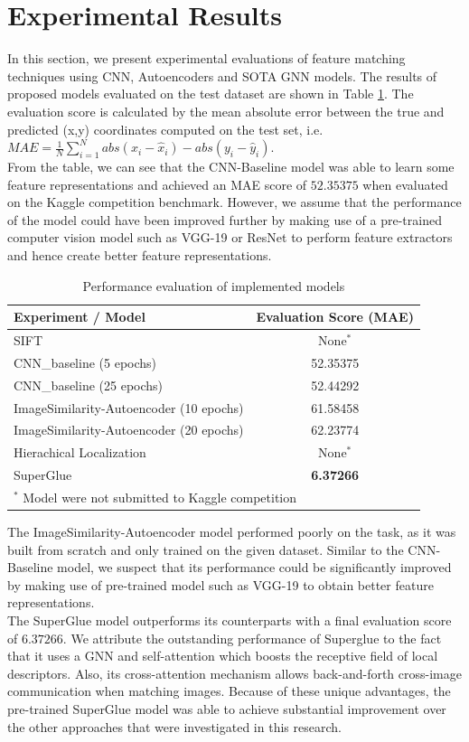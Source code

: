 \documentclass[conference]{IEEEtran}
\begin{document}
\section{Experimental Results}
\label{experimental_results}
In this section, we present experimental evaluations of feature matching techniques using CNN, Autoencoders and SOTA GNN models. The results of proposed models evaluated on the test dataset are shown in Table \ref{tab:results}. The evaluation score is calculated by the mean absolute error between the true and predicted (x,y) coordinates computed on the test set, i.e. $MAE = \frac{1}{N} \sum_{i=1}^{N} abs(x_i - \hat{x}_i) - abs(y_i - \hat{y}_i)$. \\
From the table, we can see that the CNN-Baseline model was able to learn some feature representations and achieved an MAE score of $52.35375$ when evaluated on the Kaggle competition benchmark. However, we assume that the performance of the model could have been improved further by making use of a pre-trained computer vision model such as VGG-19 or ResNet to perform feature extractors and hence create better feature representations.\\
\begin{table}[htbp]
\caption{Performance evaluation of implemented models}
\begin{center}
\begin{tabular}{|l|c|}
\hline
\textbf{Experiment / Model} & \textbf{Evaluation Score (MAE)} \\
\hline
SIFT & None$^{\mathrm{*}}$ \\
CNN\_baseline (5 epochs)  & 52.35375 \\
CNN\_baseline (25 epochs) & 52.44292 \\
ImageSimilarity-Autoencoder (10 epochs) & 61.58458 \\
ImageSimilarity-Autoencoder (20 epochs)  & 62.23774 \\
Hierachical Localization & None$^{\mathrm{*}}$ \\
SuperGlue & \textbf{6.37266} \\
\hline
\multicolumn{2}{l}{$^{\mathrm{*}}$ Model were not submitted to Kaggle competition}
\end{tabular}
\label{tab:results}
\end{center}
\end{table}
The ImageSimilarity-Autoencoder model performed poorly on the task, as it was built from scratch and only trained on the given dataset. Similar to the CNN-Baseline model, we suspect that its performance could be significantly improved by making use of pre-trained model such as VGG-19 to obtain better feature representations. \\ 
The SuperGlue model outperforms its counterparts with a final evaluation score of $6.37266$. We attribute the outstanding performance of Superglue to the fact that it uses a GNN and self-attention which boosts the receptive field of local descriptors. Also, its cross-attention mechanism allows back-and-forth cross-image communication when matching images. Because of these unique advantages, the pre-trained SuperGlue model was able to achieve substantial improvement over the other approaches that were investigated in this research.
\end{document}
